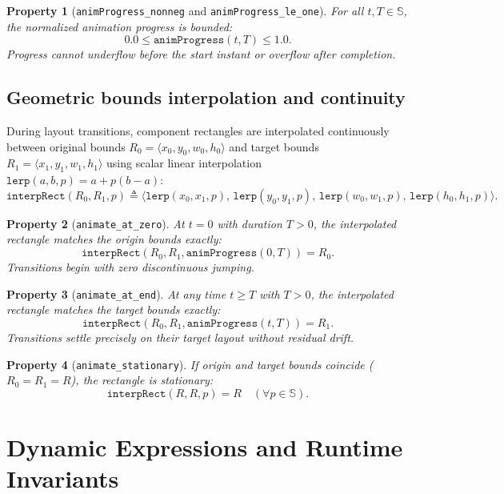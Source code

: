 \documentclass[11pt,a4paper]{article}
\newcommand{\Sc}{\mathbb{S}}
\newcommand{\lo}[1]{\texttt{#1}}       %
\theoremstyle{definition}
\theoremstyle{plain}
\newtheorem{property}{Property}[section]
\theoremstyle{remark}
\begin{document}
\begin{property}[\lo{animProgress\_nonneg} and \lo{animProgress\_le\_one}]
For all $t, T \in \Sc$, the normalized animation progress is bounded:
\[
  0.0 \le \lo{animProgress}(t, T) \le 1.0.
\]
Progress cannot underflow before the start instant or overflow after completion.
\end{property}

\subsection{Geometric bounds interpolation and continuity}
\label{sec:anim-interp}

During layout transitions, component rectangles are interpolated continuously between
original bounds $R_0 = \langle x_0, y_0, w_0, h_0 \rangle$ and target bounds
$R_1 = \langle x_1, y_1, w_1, h_1 \rangle$ using scalar linear interpolation
$\lo{lerp}(a, b, p) = a + p(b - a)$:
\[
  \lo{interpRect}(R_0, R_1, p) \triangleq \langle
    \lo{lerp}(x_0, x_1, p),\, \lo{lerp}(y_0, y_1, p),\,
    \lo{lerp}(w_0, w_1, p),\, \lo{lerp}(h_0, h_1, p) \rangle.
\]

\begin{property}[\lo{animate\_at\_zero}]
At $t = 0$ with duration $T > 0$, the interpolated rectangle matches the origin bounds exactly:
\[
  \lo{interpRect}(R_0, R_1, \lo{animProgress}(0, T)) = R_0.
\]
Transitions begin with zero discontinuous jumping.
\end{property}

\begin{property}[\lo{animate\_at\_end}]
At any time $t \ge T$ with $T > 0$, the interpolated rectangle matches the target bounds exactly:
\[
  \lo{interpRect}(R_0, R_1, \lo{animProgress}(t, T)) = R_1.
\]
Transitions settle precisely on their target layout without residual drift.
\end{property}

\begin{property}[\lo{animate\_stationary}]
If origin and target bounds coincide ($R_0 = R_1 = R$), the rectangle is stationary:
\[
  \lo{interpRect}(R, R, p) = R \quad (\forall p \in \Sc).
\]
\end{property}

\section{Dynamic Expressions and Runtime Invariants}
\label{sec:dynamic-expressions}
\end{document}
